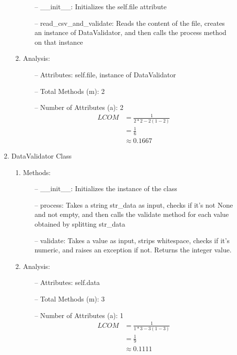 \begin{enumerate}
\begin{enumerate}
\begin{enumerate}
\begin{enumerate}
            \item[--] \_\_init\_\_: Initializes the self.file attribute
            \item[--] read\_csv\_and\_validate: Reads the content of the file, creates an instance of DataValidator, and then calls the process method on that instance
        \end{enumerate}
        \item Analysis:
        \begin{enumerate}
            \item[--] Attributes: self.file, instance of DataValidator
            \item[--] Total Methods (m): 2
            \item[--] Number of Attributes (a): 2
            \begin{align}
                LCOM    &= \frac{1}{2*2 - 2(1-2)} \\        
                        &= \frac{1}{6} \\
                        &\approx	 0.1667
            \end{align}
        \end{enumerate}
    \end{enumerate}
    \item DataValidator Class\\
    \begin{enumerate}
        \item Methods:
        \begin{enumerate}
            \item[--] \_\_init\_\_: Initializes the instance of the class
            \item[--] process: Takes a string str\_data as input, checks if it's not None and not empty, and then calls the validate method for each value obtained by splitting str\_data
            \item[--] validate: Takes a value as input, strips whitespace, checks if it's numeric, and raises an exception if not. Returns the integer value.
        \end{enumerate}
        \item Analysis:
        \begin{enumerate}
            \item[--] Attributes: self.data
            \item[--] Total Methods (m): 3
            \item[--] Number of Attributes (a): 1
            \begin{align}
                LCOM    &= \frac{1}{1*3 - 3(1-3)} \\        
                        &= \frac{1}{9} \\ 
                        &\approx	 0.1111
            \end{align}
        \end{enumerate}
    \end{enumerate}
\end{enumerate}
\end{enumerate}

